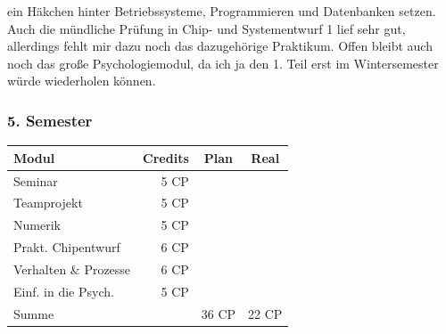 ein Häkchen hinter Betriebssysteme, Programmieren und Datenbanken
setzen. Auch die mündliche Prüfung in Chip- und Systementwurf 1 lief
sehr gut, allerdings fehlt mir dazu noch das dazugehörige Praktikum. 
Offen bleibt  auch noch das
große Psychologiemodul, da ich ja den 1. Teil erst im Wintersemester
würde wiederholen können.
%

\subsubsection*{5. Semester}
{
\footnotesize
\begin{tabular}{|l|r|c|c|}
\hline \textbf{Modul}		& \textbf{Credits} 	& \textbf{Plan} & \textbf{Real} \\ 
\hline
\hline Seminar 				& 5 CP 				& \nx 			& 	 	\\ 
\hline Teamprojekt	 		& 5 CP 				& \nx 			& 		\\ 
\hline Numerik			 	& 5 CP 				& \nx 			& \nx 	\\ 
\hline Prakt. Chipentwurf	& 6 CP 				& \nx 			& \nx	\\ 
\hline Verhalten \& Prozesse\footnotemark[\value{footnote}]& 6 CP	& \nx 			& \nx	 	\\ 
\hline Einf. in die Psych. 	& 5 CP 				& \nx 			& \nx	\\ 
\hline
\hline Summe 				&  					& 36 CP 		& 22 CP \\ 
\hline 
\end{tabular}
}
\footnotetext[\value{footnote}]{Gesetzmäßigkeiten von Verhalten und mentalen Prozessen} 

